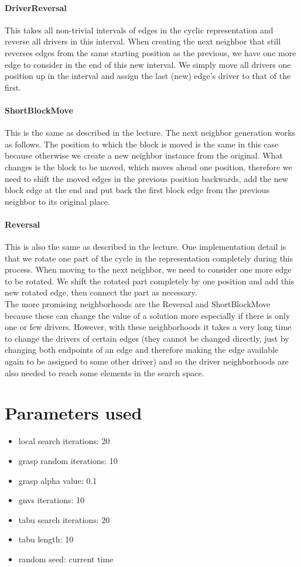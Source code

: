 \documentclass{article}
\begin{document}
\paragraph{DriverReversal}
This takes all non-trivial intervals of edges in the cyclic representation and reverse all drivers in this interval. When creating the next neighbor that still reverses edges from the same starting position as the previous, we have one more edge to consider in the end of this new interval. We simply move all drivers one position up in the interval and assign the last (new) edge's driver to that of the first.
\paragraph{ShortBlockMove}
This is the same as described in the lecture. The next neighbor generation works as follows. The position to which the block is moved is the same in this case because otherwise we create a new neighbor instance from the original. What changes is the block to be moved, which moves ahead one position, therefore we need to shift the moved edges in the previous position backwards, add the new block edge at the end and put back the first block edge from the previous neighbor to its original place.
\paragraph{Reversal}
This is also the same as described in the lecture. One implementation detail is that we rotate one part of the cycle in the representation completely during this process. When moving to the next neighbor, we need to consider one more edge to be rotated. We shift the rotated part completely by one position and add this new rotated edge, then connect the part as necessary.
\medskip\\
The more promising neighborhoods are the Reversal and ShortBlockMove because these can change the value of a solution more especially if there is only one or few drivers. However, with these neighborhoods it takes a very long time to change the drivers of certain edges (they cannot be changed directly, just by changing both endpoints of an edge and therefore making the edge available again to be assigned to some other driver) and so the driver neighborhoods are also needed to reach some elements in the search space.
\section*{Parameters used}
\begin{itemize}
	\item local search iterations: 20
	\item grasp random iterations: 10
	\item grasp alpha value: 0.1
	\item gnvs iterations: 10
	\item tabu search iterations: 20
	\item tabu length: 10
	\item random seed: current time
\end{itemize}
\end{document}
